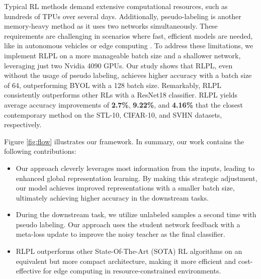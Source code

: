 Typical RL methods demand extensive computational resources, such as hundreds of TPUs over several days. Additionally, pseudo-labeling is another memory-heavy method as it uses two networks simultaneously. These requirements are challenging in scenarios where fast, efficient models are needed, like in autonomous vehicles or edge computing \cite{guo2023architecture}. To address these limitations, we implement RLPL on a more manageable batch size and a shallower network, leveraging just two Nvidia 4090 GPUs. Our study shows that RLPL, even without the usage of pseudo labeling, achieves higher accuracy with a batch size of 64, outperforming BYOL with a 128 batch size. Remarkably, RLPL consistently outperforms other RLs with a ResNet18 classifier. RLPL yields average accuracy improvements of \textbf{2.7\%}, \textbf{9.22\%}, and \textbf{4.16\%} that the closest contemporary method on the STL-10, CIFAR-10, and SVHN datasets, respectively.


Figure \ref{fig:flow} illustrates our framework. In summary, our work contains the following contributions:

\begin{itemize}

\item Our approach cleverly leverages most information from the inputs, leading to enhanced global representation learning. By making this strategic adjustment, our model achieves improved representations with a smaller batch size, ultimately achieving higher accuracy in the downstream tasks.

\item During the downstream task, we utilize unlabeled samples a second time with pseudo labeling. Our approach uses the student network feedback with a meta-loss update to improve the noisy teacher \cite{xie2020self} as the final classifier.

\item RLPL outperforms other State-Of-The-Art (SOTA) RL algorithms on an equivalent but more compact architecture, making it more efficient and cost-effective for edge computing in resource-constrained environments.

\end{itemize}